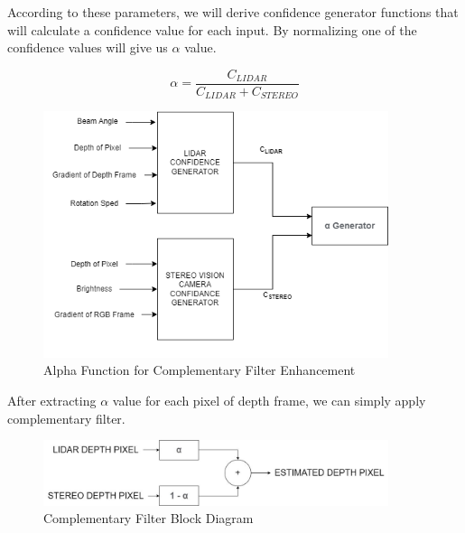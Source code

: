 \documentclass[12pt]{article}
\begin{document}
According to these parameters, we will derive confidence generator functions that will calculate a confidence value for each input. By normalizing one of the confidence values will give us $\alpha$ value.

\begin{equation}
    \alpha = \frac{C_{LIDAR}}{C_{LIDAR} + C_{STEREO}}
\end{equation}

\begin{figure}[H]
    \centering
    \includegraphics[width=0.9\textwidth]{AlphaFunction.jpeg}
    \caption{Alpha Function for Complementary Filter Enhancement}
\end{figure}

After extracting $\alpha$ value for each pixel of depth frame, we can simply apply complementary filter.

\begin{figure}[H]
    \centering
    \includegraphics[width=0.9\textwidth]{CompFiltBD.jpeg}
    \caption{Complementary Filter Block Diagram}
\end{figure}



\end{document}
